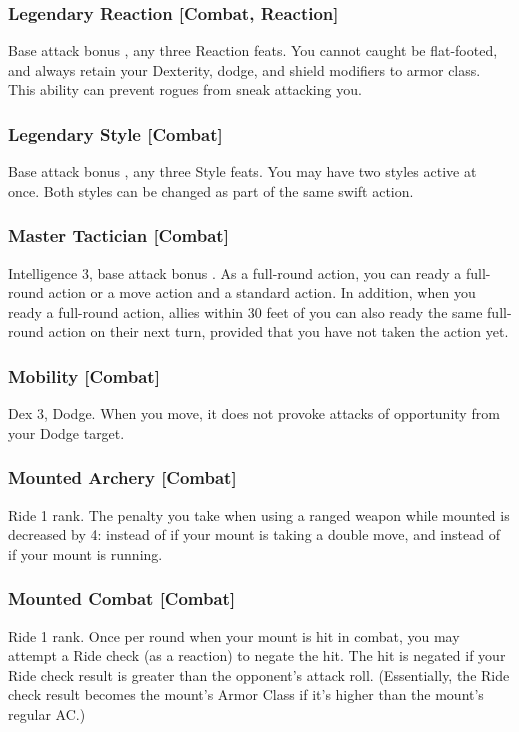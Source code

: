 \subsubsection{Legendary Reaction [Combat, Reaction]}
\featpre Base attack bonus , any three Reaction feats.
\featben You cannot caught be flat-footed, and always retain your Dexterity, dodge, and shield modifiers to armor class. This ability can prevent rogues from sneak attacking you.

\subsubsection{Legendary Style [Combat]}
\featpre Base attack bonus , any three Style feats.
\featben You may have two styles active at once. Both styles can be changed as part of the same swift action.

\subsubsection{Master Tactician [Combat]}
\featpre Intelligence 3, base attack bonus .
\featben As a full-round action, you can ready a full-round action or a move action and a standard action. In addition, when you ready a full-round action, allies within 30 feet of you can also ready the same full-round action on their next turn, provided that you have not taken the action yet.

\subsubsection{Mobility [Combat]}
 Dex 3, Dodge.
 When you move, it does not provoke attacks of opportunity from your Dodge target.

\subsubsection{Mounted Archery [Combat]}
\featpre Ride 1 rank.
 The penalty you take when using a ranged weapon while mounted is decreased by 4:  instead of  if your mount is taking a double move, and  instead of  if your mount is running.

\subsubsection{Mounted Combat [Combat]}
 Ride 1 rank.
 Once per round when your mount is hit in combat, you may attempt a Ride check (as a reaction) to negate the hit. The hit is negated if your Ride check result is greater than the opponent's attack roll. (Essentially, the Ride check result becomes the mount's Armor Class if it's higher than the mount's regular AC.)%

